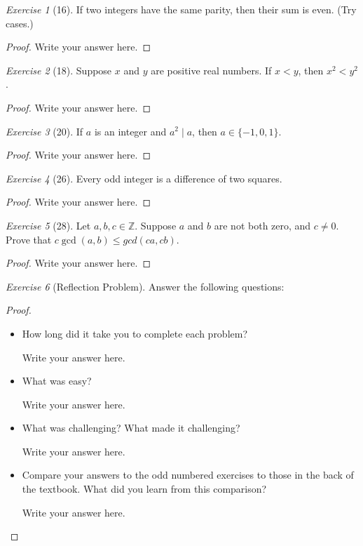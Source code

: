 \documentclass[12pt]{amsart}
\theoremstyle{remark}
\newtheorem*{exercise}{Exercise}%
\def\ZZ{\ensuremath{\mathbb Z}}
\theoremstyle{mycomment}
\begin{document}
\begin{exercise}[16] If two integers have the same parity, then their sum is even. (Try cases.)
\begin{proof}
Write your answer here.
\end{proof}
\end{exercise}

\begin{exercise}[18] Suppose $x$ and $y$ are positive real numbers. If $x<y$, then $x^{2}<y^{2}$.
\begin{proof}
Write your answer here.
\end{proof}
\end{exercise}

\begin{exercise}[20] If $a$ is an integer and $a^{2}\mid a$, then $a\in\{-1,0,1\}$.
\begin{proof}
Write your answer here.
\end{proof}
\end{exercise}

\begin{exercise}[26] Every odd integer is a difference of two squares. 
\begin{proof}
Write your answer here.
\end{proof}
\end{exercise}

\begin{exercise}[28] Let $a,b,c\in\ZZ$. Suppose $a$ and $b$ are not both  zero, and $c\ne 0$. Prove that $c\gcd(a,b)\le gcd(ca,cb)$.
\begin{proof}
Write your answer here.
\end{proof}
\end{exercise}

\begin{exercise}[Reflection Problem]
Answer the following questions:


\begin{proof} \ 


\begin{itemize}
\item How long did it take you to complete each problem? 

Write your answer here.
\item What was easy?

Write your answer here.
\item What was challenging? What made it challenging?

Write your answer here.
\item Compare your answers to the odd numbered exercises to those in the back of the textbook. What did you learn from this comparison?

Write your answer here.
\end{itemize}\end{proof}
\end{exercise}


 
\end{document}
